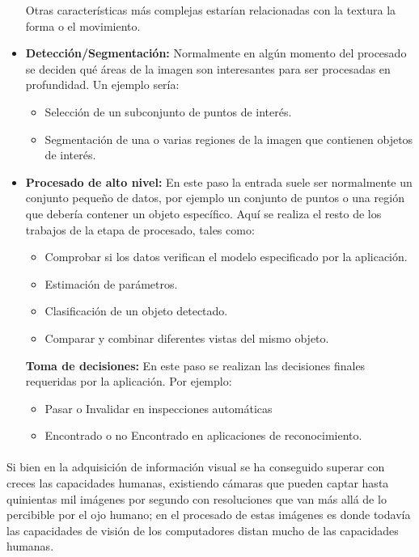 \documentclass[a4paper,12pt,titlepage,final]{book}
\begin{document}
\begin{itemize}
  Otras características más complejas estarían relacionadas con la textura la forma o el movimiento.
  
  \item \textbf{Detección/Segmentación:} Normalmente en algún momento del procesado se deciden qué áreas de la imagen son interesantes para ser procesadas en profundidad. Un ejemplo sería:
  
  \begin{itemize}
    \item Selección de un subconjunto de puntos de interés.
    \item Segmentación de una o varias regiones de la imagen que contienen objetos de interés.
  \end{itemize}
  
  \item \textbf{Procesado de alto nivel:} En este paso la entrada suele ser normalmente un conjunto pequeño de datos, por ejemplo un conjunto de puntos o una región que debería contener un objeto específico. Aquí se realiza el resto de los trabajos de la etapa de procesado, tales como:
  
  \begin{itemize}
    \item Comprobar si los datos verifican el modelo especificado por la aplicación.
    \item Estimación de parámetros.
    \item Clasificación de un objeto detectado.
    \item Comparar y combinar diferentes vistas del mismo objeto.
  \end{itemize}
  
  \textbf{Toma de decisiones:} En este paso se realizan las decisiones finales requeridas por la aplicación. Por ejemplo:
  
  \begin{itemize}
    \item Pasar o Invalidar en inspecciones automáticas
    \item Encontrado o no Encontrado en aplicaciones de reconocimiento.
  \end{itemize}
  
\end{itemize}

\paragraph{}
Si bien en la adquisición de información visual se ha conseguido superar con creces las capacidades humanas, existiendo cámaras que pueden captar hasta quinientas mil imágenes por segundo con resoluciones que van más allá de lo percibible por el ojo humano; en el procesado de estas imágenes es donde todavía las capacidades de visión de los computadores distan mucho de las capacidades humanas.
\end{document}
